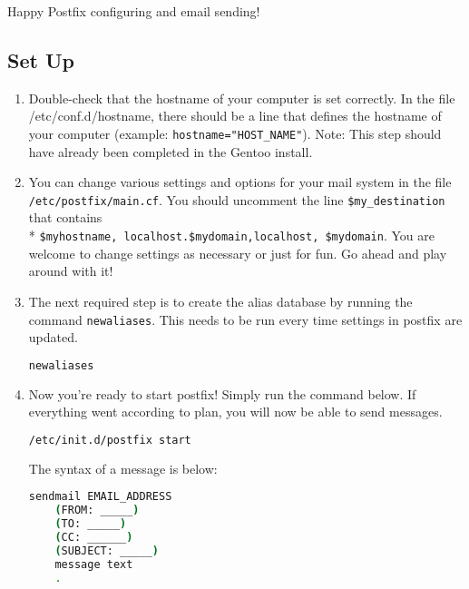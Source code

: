 \documentclass{article}
\begin{document}
Happy Postfix configuring and email sending!



\subsection*{Set Up}

\begin{enumerate}

\item Double-check that the hostname of your computer is set correctly. In the file /etc/conf.d/hostname, there should be a line that defines the hostname of your computer (example: \verb|hostname="HOST_NAME"|). Note: This step should have already been completed in the Gentoo install.

\item You can change various settings and options for your mail system in the file \verb|/etc/postfix/main.cf|. You should uncomment the line \verb|$my_destination| that contains \\* \verb|$myhostname, localhost.$mydomain,localhost, $mydomain|. You are welcome to change  settings as necessary or just for fun. Go ahead and play around with it!

\item The next required step is to create the alias database by running the command
\verb|newaliases|. This needs to be run every time settings in postfix are updated.

\begin{lstlisting}[basicstyle=\ttfamily, backgroundcolor = \color{lightgray}, language = bash, xleftmargin = 0cm, framexleftmargin = 1em]
newaliases
\end{lstlisting}

\item Now you're ready to start postfix! Simply run the command below. If everything went according to plan, you will now be able to send messages.

\begin{lstlisting}[basicstyle=\ttfamily, backgroundcolor = \color{lightgray}, language = bash, xleftmargin = 0cm, framexleftmargin = 1em]
/etc/init.d/postfix start
\end{lstlisting}

The syntax of a message is below:

\begin{lstlisting}[basicstyle=\ttfamily, backgroundcolor = \color{lightgray}, language = bash, xleftmargin = 0cm, framexleftmargin = 1em]
sendmail EMAIL_ADDRESS
    (FROM: _____)
    (TO: _____)
    (CC: ______)
    (SUBJECT: _____)
    message text
    .
\end{lstlisting}


\end{enumerate}
\end{document}
